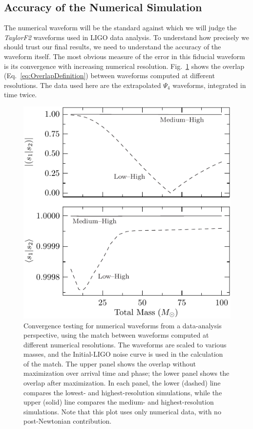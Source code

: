 \subsection{Accuracy of the Numerical Simulation}
\label{sec:Accuracy}

The numerical waveform will be the standard against which we will
judge the \textit{TaylorF2} waveforms used in LIGO data analysis.  To
understand how precisely we should trust our final results, we need to
understand the accuracy of the waveform itself.  The most obvious
measure of the error in this fiducial waveform is its convergence with
increasing numerical resolution.  Fig.~\ref{f:accuracy} shows the
overlap (Eq.~\eqref{eq:OverlapDefinition}) between waveforms computed
at different resolutions.  The data used here are the extrapolated
$\Psi_4$ waveforms, integrated in time twice.
\begin{figure}
  \begin{center}
    \includegraphics[width=0.55\linewidth]{figures/comparison/Accuracy}
  \end{center}
  \caption[Convergence testing for numerical waveforms ]{
  \label{f:accuracy}
    Convergence testing for numerical waveforms from a
    data-analysis perspective, using the match between waveforms
    computed at different numerical resolutions.  The waveforms are
    scaled to various masses, and the Initial-LIGO noise curve is used
    in the calculation of the match.  The upper panel shows the
    overlap without maximization over arrival time and phase; the
    lower panel shows the overlap after maximization.  In each panel,
    the lower (dashed) line compares the lowest- and
    highest-resolution simulations, while the upper (solid) line
    compares the medium- and highest-resolution simulations.  Note
    that this plot uses only numerical data, with no post-Newtonian
    contribution.}
\end{figure}%


